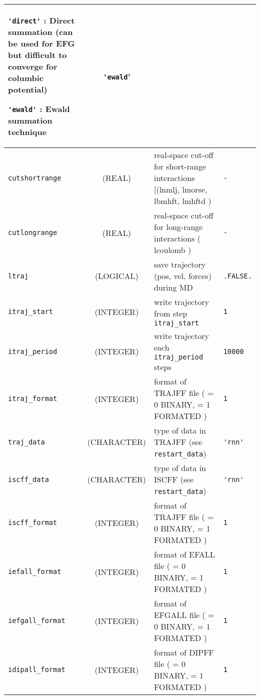 \documentclass[a4paper,8pt]{article}
\begin{document}
\begin{longtable}{l|c|m{8cm}|m{2cm}}
					\verb?'direct'? : Direct summation (can be used for EFG but difficult to converge for columbic potential) \newline

					\verb?'ewald'? : Ewald summation technique \newline                                 &  \verb?'ewald?'      \tabularnewline
\hline
\rule[-0.75cm]{0cm}{1.5cm}
\verb?cutshortrange?    
                 & (REAL)             &  real-space cut-off for short-range interactions  
                                         [(lnmlj, lmorse, lbmhft, lmhftd )  & \verb?-?\\
\hline
\rule[-0.75cm]{0cm}{1.5cm}
\verb?cutlongrange?     
                 & (REAL)             &  real-space cut-off for long-range interactions ( lcoulomb )                        & \verb?-?\\
\hline
\rule[-0.75cm]{0cm}{1.5cm}
\verb?ltraj?     & (LOGICAL)          &  save trajectory (pos, vel, forces) during MD                                       & \verb?.FALSE.? \\
\hline
\rule[-0.75cm]{0cm}{1.5cm}
\verb?itraj_start?   
                 & (INTEGER)          &  write trajectory from step \verb?itraj_start?                                      & \verb?1? \\
\hline
\rule[-0.75cm]{0cm}{1.5cm}
\verb?itraj_period?  
                 & (INTEGER)          &  write trajectory each \verb?itraj_period? steps                                    & \verb?10000? \\
\hline
\rule[-0.75cm]{0cm}{1.5cm}
\verb?itraj_format?  
                 & (INTEGER)          &  format of TRAJFF file ( = 0 BINARY, = 1 FORMATED )                                 & \verb?1? \\
\hline
\rule[-0.75cm]{0cm}{1.5cm}
\verb?traj_data? & (CHARACTER)        &  type of data in TRAJFF (see \verb?restart_data?)                                   & \verb?'rnn'? \\
\hline
\rule[-0.75cm]{0cm}{1.5cm}
\verb?iscff_data?& (CHARACTER)        &  type of data in ISCFF (see \verb?restart_data?)                                    & \verb?'rnn'? \\
\hline
\rule[-0.75cm]{0cm}{1.5cm}
\verb?iscff_format? 
                 & (INTEGER)          &  format of TRAJFF file ( = 0 BINARY, = 1 FORMATED )                                 & \verb?1? \\
\hline
\rule[-0.75cm]{0cm}{1.5cm}
\verb?iefall_format? 
                 & (INTEGER)          &  format of EFALL file ( = 0 BINARY, = 1 FORMATED )                                  & \verb?1? \\
\hline
\rule[-0.75cm]{0cm}{1.5cm}
\verb?iefgall_format? 
                 & (INTEGER)          &  format of EFGALL file ( = 0 BINARY, = 1 FORMATED )                                 & \verb?1? \\
\hline
\rule[-0.75cm]{0cm}{1.5cm}
\verb?idipall_format? 
                 & (INTEGER)          &  format of DIPFF file ( = 0 BINARY, = 1 FORMATED )                                  & \verb?1? \\
\hline
\hline
\end{longtable}
\end{document}
